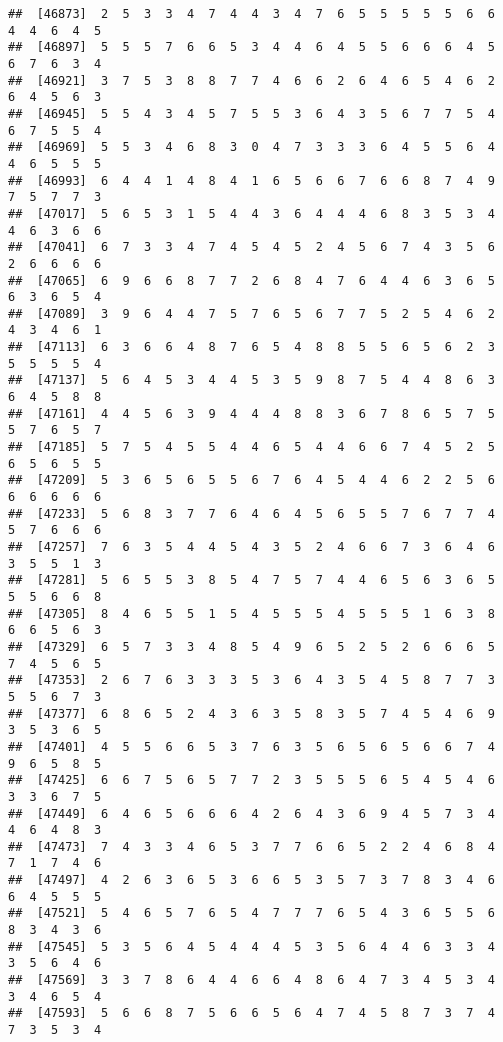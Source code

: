 \documentclass[
]{book}
\begin{document}
\begin{verbatim}
##  [46873]  2  5  3  3  4  7  4  4  3  4  7  6  5  5  5  5  5  6  6  4  4  6  4  5
##  [46897]  5  5  5  7  6  6  5  3  4  4  6  4  5  5  6  6  6  4  5  6  7  6  3  4
##  [46921]  3  7  5  3  8  8  7  7  4  6  6  2  6  4  6  5  4  6  2  6  4  5  6  3
##  [46945]  5  5  4  3  4  5  7  5  5  3  6  4  3  5  6  7  7  5  4  6  7  5  5  4
##  [46969]  5  5  3  4  6  8  3  0  4  7  3  3  3  6  4  5  5  6  4  4  6  5  5  5
##  [46993]  6  4  4  1  4  8  4  1  6  5  6  6  7  6  6  8  7  4  9  7  5  7  7  3
##  [47017]  5  6  5  3  1  5  4  4  3  6  4  4  4  6  8  3  5  3  4  4  6  3  6  6
##  [47041]  6  7  3  3  4  7  4  5  4  5  2  4  5  6  7  4  3  5  6  2  6  6  6  6
##  [47065]  6  9  6  6  8  7  7  2  6  8  4  7  6  4  4  6  3  6  5  6  3  6  5  4
##  [47089]  3  9  6  4  4  7  5  7  6  5  6  7  7  5  2  5  4  6  2  4  3  4  6  1
##  [47113]  6  3  6  6  4  8  7  6  5  4  8  8  5  5  6  5  6  2  3  5  5  5  5  4
##  [47137]  5  6  4  5  3  4  4  5  3  5  9  8  7  5  4  4  8  6  3  6  4  5  8  8
##  [47161]  4  4  5  6  3  9  4  4  4  8  8  3  6  7  8  6  5  7  5  5  7  6  5  7
##  [47185]  5  7  5  4  5  5  4  4  6  5  4  4  6  6  7  4  5  2  5  6  5  6  5  5
##  [47209]  5  3  6  5  6  5  5  6  7  6  4  5  4  4  6  2  2  5  6  6  6  6  6  6
##  [47233]  5  6  8  3  7  7  6  4  6  4  5  6  5  5  7  6  7  7  4  5  7  6  6  6
##  [47257]  7  6  3  5  4  4  5  4  3  5  2  4  6  6  7  3  6  4  6  3  5  5  1  3
##  [47281]  5  6  5  5  3  8  5  4  7  5  7  4  4  6  5  6  3  6  5  5  5  6  6  8
##  [47305]  8  4  6  5  5  1  5  4  5  5  5  4  5  5  5  1  6  3  8  6  6  5  6  3
##  [47329]  6  5  7  3  3  4  8  5  4  9  6  5  2  5  2  6  6  6  5  7  4  5  6  5
##  [47353]  2  6  7  6  3  3  3  5  3  6  4  3  5  4  5  8  7  7  3  5  5  6  7  3
##  [47377]  6  8  6  5  2  4  3  6  3  5  8  3  5  7  4  5  4  6  9  3  5  3  6  5
##  [47401]  4  5  5  6  6  5  3  7  6  3  5  6  5  6  5  6  6  7  4  9  6  5  8  5
##  [47425]  6  6  7  5  6  5  7  7  2  3  5  5  5  6  5  4  5  4  6  3  3  6  7  5
##  [47449]  6  4  6  5  6  6  6  4  2  6  4  3  6  9  4  5  7  3  4  4  6  4  8  3
##  [47473]  7  4  3  3  4  6  5  3  7  7  6  6  5  2  2  4  6  8  4  7  1  7  4  6
##  [47497]  4  2  6  3  6  5  3  6  6  5  3  5  7  3  7  8  3  4  6  6  4  5  5  5
##  [47521]  5  4  6  5  7  6  5  4  7  7  7  6  5  4  3  6  5  5  6  8  3  4  3  6
##  [47545]  5  3  5  6  4  5  4  4  4  5  3  5  6  4  4  6  3  3  4  3  5  6  4  6
##  [47569]  3  3  7  8  6  4  4  6  6  4  8  6  4  7  3  4  5  3  4  3  4  6  5  4
##  [47593]  5  6  6  8  7  5  6  6  5  6  4  7  4  5  8  7  3  7  4  7  3  5  3  4

\end{verbatim}
\end{document}
